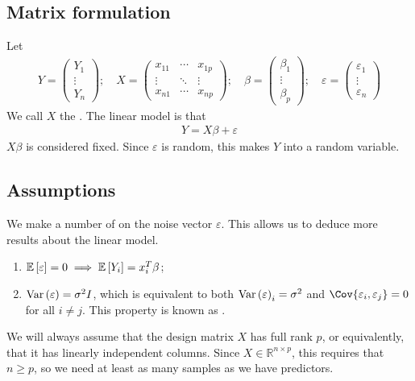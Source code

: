 \subsection{Matrix formulation}
Let
\begin{align*}
	Y = \begin{pmatrix}
		Y_1    \\
		\vdots \\
		Y_n
	\end{pmatrix};\quad X = \begin{pmatrix}
		x_{11} & \cdots & x_{1p} \\
		\vdots & \ddots & \vdots \\
		x_{n1} & \cdots & x_{np}
	\end{pmatrix};\quad \beta = \begin{pmatrix}
		\beta_1 \\
		\vdots  \\
		\beta_p
	\end{pmatrix};\quad \varepsilon = \begin{pmatrix}
		\varepsilon_1 \\
		\vdots        \\
		\varepsilon_n
	\end{pmatrix}
\end{align*}
We call $X$ the .
The linear model is that
\begin{align*}
	Y = X\beta + \varepsilon
\end{align*}
$X\beta$ is considered fixed.
Since $\varepsilon$ is random, this makes $Y$ into a random variable.

\subsection{Assumptions}
We make a number of  on the noise vector $\varepsilon$.
This allows us to deduce more results about the linear model.
\begin{enumerate}
	\item $\mathbb{E}\left[{\varepsilon}\right] = 0 \implies \mathbb{E}\left[{Y_i}\right] = x_i^T \beta$;
	\item $\operatorname{Var}\left({\varepsilon}\right) = \sigma^2 I$, which is equivalent to both $\operatorname{Var}\left({\varepsilon}\right)_i = \sigma^2$ and $\Cov{\varepsilon_i, \varepsilon_j} = 0$ for all $i \neq j$.
	      This property is known as .
\end{enumerate}
We will always assume that the design matrix $X$ has full rank $p$, or equivalently, that it has linearly independent columns.
Since $X \in \mathbb R^{n \times p}$, this requires that $n \geq p$, so we need at least as many samples as we have predictors.

